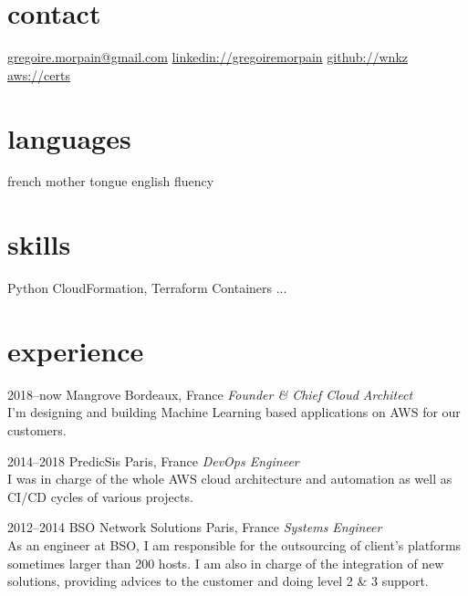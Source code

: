 \documentclass[]{cv-a4}
\begin{document}


\begin{aside} %
\section{contact}
\href{mailto:gregoire.morpain@gmail.com}{gregoire.morpain@gmail.com}
\href{https://www.linkedin.com/in/gregoiremorpain/en}{linkedin://gregoiremorpain}
\href{https://github.com/wnkz}{github://wnkz}
\href{https://www.credly.com/users/gregoire-morpain/badges}{aws://certs}
\section{languages}
french mother tongue
english fluency
\section{skills}
Python
CloudFormation, Terraform
Containers
...
\end{aside}


\section{experience}

\begin{entrylist}


\entry
{2018--now}
{Mangrove}
{Bordeaux, France}
{
  \emph{Founder \& Chief Cloud Architect} \\
  I'm designing and building Machine Learning based applications on AWS
  for our customers.
}

\entry
{2014--2018}
{PredicSis}
{Paris, France}
{
  \emph{DevOps Engineer} \\
  I was in charge of the whole AWS cloud architecture and automation as well as CI/CD cycles of various projects.
}

\entry
{2012--2014}
{BSO Network Solutions}
{Paris, France}
{
  \emph{Systems Engineer} \\
  As an engineer at BSO, I am responsible for the outsourcing of client's platforms sometimes larger than 200 hosts. I am also in charge of the integration of new solutions, providing advices to the customer and doing level 2 \& 3 support.
}


\end{entrylist}
\end{document}
